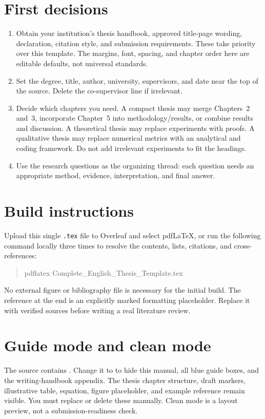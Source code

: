 \documentclass[12pt,a4paper,oneside]{report}
\newif\ifshowguidance
\begin{document}
\section*{First decisions}
\begin{enumerate}
\item Obtain your institution's thesis handbook, approved title-page wording,
declaration, citation style, and submission requirements. These take priority
over this template. The margins, font, spacing, and chapter order here are
editable defaults, not universal standards.
\item Set the degree, title, author, university, supervisors, and date near
the top of the source. Delete the co-supervisor line if irrelevant.
\item Decide which chapters you need. A compact thesis may merge Chapters~2
and~3, incorporate Chapter~5 into methodology/results, or combine results
and discussion. A theoretical thesis may replace experiments with proofs.
A qualitative thesis may replace numerical metrics with an analytical and
coding framework. Do not add irrelevant experiments to fit the headings.
\item Use the research questions as the organizing thread: each question
needs an appropriate method, evidence, interpretation, and final answer.
\end{enumerate}

\section*{Build instructions}
Upload this single \texttt{.tex} file to Overleaf and select pdfLaTeX, or run
the following command locally three times to resolve the contents, lists,
citations, and cross-references:
\begin{quote}\ttfamily\small
pdflatex Complete\_English\_Thesis\_Template.tex
\end{quote}
No external figure or bibliography file is necessary for the initial build.
The reference at the end is an explicitly marked formatting placeholder.
Replace it with verified sources before writing a real literature review.

\section*{Guide mode and clean mode}
The source contains \texttt{\string\showguidancetrue}. Change it to
\texttt{\string\showguidancefalse} to hide this manual, all blue guide
boxes, and the writing-handbook appendix. The thesis chapter structure,
draft markers, illustrative table, equation, figure placeholder, and example
reference remain visible. You must replace or delete these manually. Clean
mode is a layout preview, not a submission-readiness check.
\end{document}
